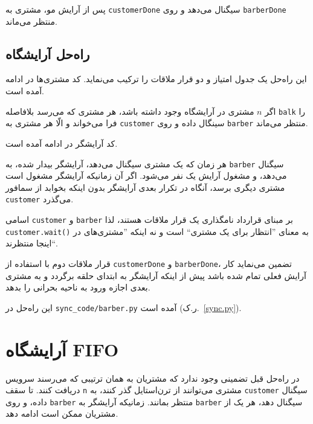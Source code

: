 \documentclass{book}
\newcommand{\clearemptydoublepage}{\newpage\cleardoublepage}
\begin{document}
    پس از آرایش مو، مشتری به  {\tt customerDone}  سیگنال می‌دهد و روی {\tt barberDone} منتظر می‌ماند. 

\clearemptydoublepage
\subsection{راه‌حل آرایشگاه}

    این راه‌حل یک جدول امتیاز و دو قرار ملاقات را ترکیب می‌نماید. کد مشتری‌ها در ادامه آمده است. 

\begin{latin}

\end{latin}

    اگر  $n$ مشتری در آرایشگاه وجود داشته باشد، هر مشتری که می‌رسد بلافاصله {\tt balk} را فرا می‌خواند 
    و الّا هر مشتری به {\tt customer} سینگال داده و روی {\tt barber} منتظر می‌ماند. 

    کد آرایشگر در ادامه آمده است. 

\begin{latin}

\end{latin}

    هر زمان که  یک مشتری سیگنال می‌دهد، آرایشگر بیدار شده، به  {\tt barber} سیگنال می‌دهد، و مشغول آرایش یک نفر می‌شود. 
    اگر آن زمانیکه آرایشگر مشغول است مشتری دیگری برسد، 
    آنگاه در تکرار بعدی آرایشگر بدون اینکه بخوابد از سمافور {\tt customer} می‌گذرد. 

    اسامی {\tt customer} و {\tt barber} بر مبنای قرارداد نامگذاری یک قرار ملاقات هستند، لذا {\tt customer.wait()} 
    به معنای ''انتظار برای یک مشتری`` است و نه اینکه ''مشتری‌های در اینجا منتظرند``. 

    قرار ملاقات دوم با استفاده از  {\tt customerDone} و {\tt barberDone}، تضمین می‌نماید کار آرایش فعلی تمام شده باشد
    پیش از اینکه آرایشگر به ابتدای حلقه برگردد و به مشتری بعدی اجازه ورود به ناحیه بحرانی را بدهد. 

    این راه‌حل در \verb"sync_code/barber.py" آمده است (ر.ک.~\ref{sync.py}).
\clearemptydoublepage
\section{آرایشگاه FIFO}

    در راه‌حل قبل تضمینی وجود ندارد که مشتریان به همان ترتیبی که می‌رسند سرویس دریافت کنند.
    تا سقف {\tt n} مشتری می‌توانند از ترن‌استایل گذر کنند، به {\tt customer} سیگنال داده، 
    و روی {\tt barber} منتظر بمانند. زمانیکه آرایشگر به {\tt barber} سیگنال دهد، هر یک از 
    مشتریان ممکن است ادامه دهد.
\end{document}
